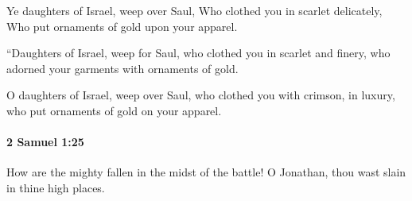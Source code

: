 			\begin{versebox}
					\item[BHS] 
					\item[ASV] Ye daughters of Israel, weep over Saul, Who clothed you in scarlet delicately, Who put ornaments of gold upon your apparel.
					\item[NIV] “Daughters of Israel, weep for Saul, who clothed you in scarlet and finery, who adorned your garments with ornaments of gold.
					\item[NRSV] O daughters of Israel, weep over Saul, who clothed you with crimson, in luxury, who put ornaments of gold on your apparel.
			\end{versebox}

		\paragraph{2 Samuel 1:25} %
			\label{2SAMUEL-1-25}

			How are the mighty fallen in the midst of the battle! O Jonathan, thou wast slain in thine high places.

